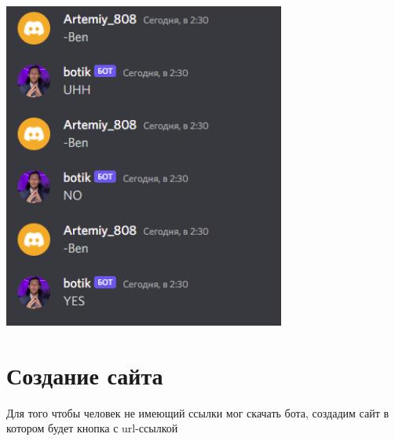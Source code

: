 \documentclass[a4paper,12pt]{article}
\begin{document}
\begin{itemize}
    \centerline{\includegraphics[width = 350px]{pictures/Ben.png}}
\end{itemize}

\newpage
\section{Создание сайта}
Для того чтобы человек не имеющий ссылки мог скачать бота, создадим сайт в котором будет кнопка с url-ссылкой
\end{document}
